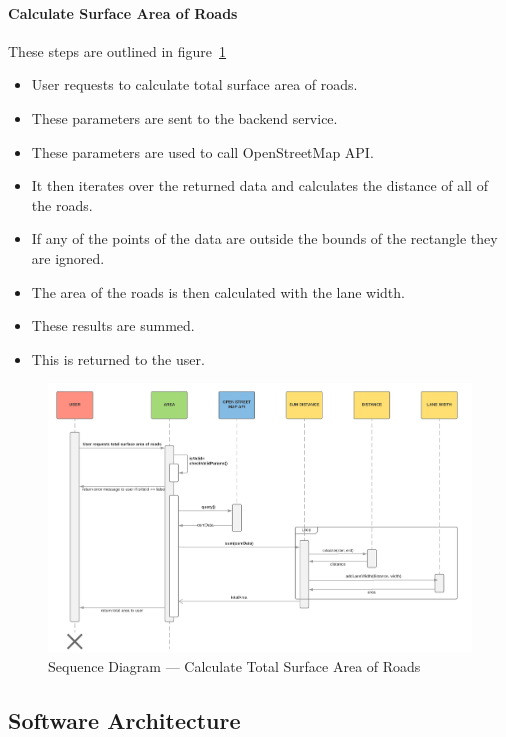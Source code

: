 \documentclass[a4paper,11pt]{article}
\begin{document}
\paragraph{Calculate Surface Area of Roads}

These steps are outlined in figure~\ref{fig:seq-total-area-roads}

\begin{itemize}
  \item User requests to calculate total surface area of roads.
  \item These parameters are sent to the backend service.
  \item These parameters are used to call OpenStreetMap API.\@
  \item It then iterates over the returned data and calculates the distance of
    all of the roads.
  \item If any of the points of the data are outside the bounds of the rectangle
    they are ignored.
  \item The area of the roads is then calculated with the lane width.
  \item These results are summed.
  \item This is returned to the user.
\end{itemize}

\begin{figure}[H]
  \includegraphics[width=\textwidth]{sequence-diagram-calculate-total-surface-area-of-roads}
  \caption{Sequence Diagram --- Calculate Total Surface Area of
  Roads}\label{fig:seq-total-area-roads}
\end{figure}

\subsection{Software Architecture}
\end{document}
